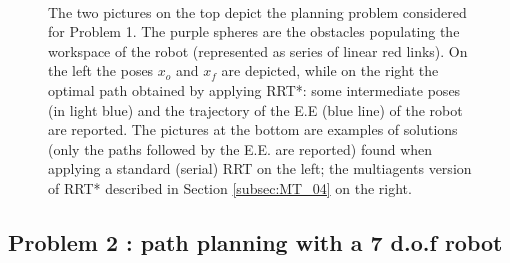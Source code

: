 \begin{figure}
	\centering
{} \quad
{} \\
 \quad
{}
\caption{The two pictures on the top depict the planning problem considered for Problem 1. The purple spheres are the obstacles populating the workspace of the robot (represented as series of linear red links). On the left the poses $x_o$ and $x_f$ are depicted, while on the right the optimal path obtained by applying RRT*: some intermediate poses (in light blue) and the trajectory of the E.E (blue line) of the robot are reported. 
The pictures at the bottom are examples of solutions (only the paths followed by the E.E. are reported) found when applying a standard (serial) RRT on the left; the multiagents version of RRT* described in Section \ref{subsec:MT_04} on the right.}
	\label{fig:Problem_1}
\end{figure}

\subsection{Problem 2 : path planning with a 7 d.o.f robot }
\label{sec:probl_2}

